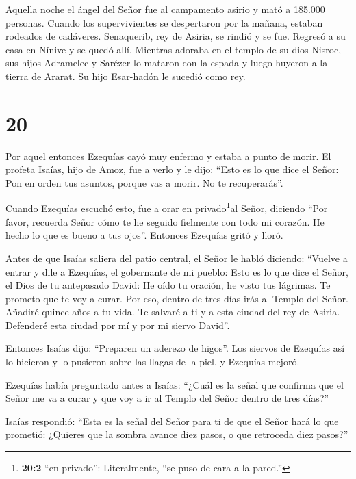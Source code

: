  Aquella noche el ángel del Señor fue al campamento asirio
y mató a 185.000 personas. Cuando los supervivientes se despertaron por
la mañana, estaban rodeados de cadáveres.  Senaquerib, rey
de Asiria, se rindió y se fue. Regresó a su casa en Nínive y se quedó
allí.  Mientras adoraba en el templo de su dios Nisroc, sus
hijos Adramelec y Sarézer lo mataron con la espada y luego huyeron a la
tierra de Ararat. Su hijo Esar-hadón le sucedió como rey.

\hypertarget{section-19}{%
\section{20}\label{section-19}}

 Por aquel entonces Ezequías cayó muy enfermo y estaba a
punto de morir. El profeta Isaías, hijo de Amoz, fue a verlo y le dijo:
``Esto es lo que dice el Señor: Pon en orden tus asuntos, porque vas a
morir. No te recuperarás''.

 Cuando Ezequías escuchó esto, fue a orar en
privado\footnote{\textbf{20:2} ``en privado'': Literalmente, ``se puso
  de cara a la pared.''}al Señor, diciendo  ``Por favor,
recuerda Señor cómo te he seguido fielmente con todo mi corazón. He
hecho lo que es bueno a tus ojos''. Entonces Ezequías gritó y lloró.

 Antes de que Isaías saliera del patio central, el Señor le
habló diciendo:  ``Vuelve a entrar y dile a Ezequías, el
gobernante de mi pueblo: Esto es lo que dice el Señor, el Dios de tu
antepasado David: He oído tu oración, he visto tus lágrimas. Te prometo
que te voy a curar. Por eso, dentro de tres días irás al Templo del
Señor.  Añadiré quince años a tu vida. Te salvaré a ti y a
esta ciudad del rey de Asiria. Defenderé esta ciudad por mí y por mi
siervo David''.

 Entonces Isaías dijo: ``Preparen un aderezo de higos''. Los
siervos de Ezequías así lo hicieron y lo pusieron sobre las llagas de la
piel, y Ezequías mejoró.

 Ezequías había preguntado antes a Isaías: ``¿Cuál es la
señal que confirma que el Señor me va a curar y que voy a ir al Templo
del Señor dentro de tres días?''

 Isaías respondió: ``Esta es la señal del Señor para ti de
que el Señor hará lo que prometió: ¿Quieres que la sombra avance diez
pasos, o que retroceda diez pasos?''

